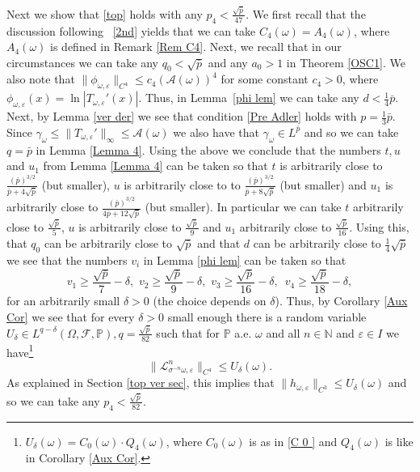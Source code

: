 \documentclass[11pt,reqno,a4paper]{article}
\theoremstyle{special}
\def\om{\omega}
\begin{document}
Next we show that \eqref{top} holds with any $p_4<\frac{\sqrt{\bar p}}{47}$. We first recall that the discussion following~ \eqref{2nd} yields   that we can take $C_4(\om)=A_4(\om)$, where $A_4(\om)$ is defined in Remark \ref{Rem C4}.
Next, we recall that in our circumstances we can take any $q_0<\sqrt{\bar p}$ and any $a_0>1$ in Theorem \ref{OSC1}.
We also note that $\|\phi_{\om,\varepsilon}\|_{C^4}\leq c_4 (\mathcal A(\om))^4$ for some constant $c_4>0$, where $\phi_{\om,\varepsilon}(x)=\ln|T_{\om,\varepsilon}'(x)|$. Thus, in Lemma~\ref{phi lem} we can take any $d<\frac14\bar p$. Next, by Lemma \ref{ver der} we see that condition \eqref{Pre Adler} holds with $p=\frac13\bar p$. Since $\gamma_\om\leq \|T_{\om,\varepsilon}' \|_\infty \leq \mathcal A(\om)$ we also have that $\gamma_\om\in L^{\bar p}$ and so we can take $q=\bar p$ in Lemma \ref{Lemma 4}. Using the above  we conclude that the numbers $t,u$ and $u_1$ from Lemma \ref{Lemma 4} can be taken so that $t$ is arbitrarily close to $\frac{(\bar p)^{3/2}}{\bar p+4\sqrt{\bar p}}$ (but smaller), $u$ is arbitrarily close to to $\frac{(\bar p)^{3/2}}{\bar p+8\sqrt{\bar p}}$ (but smaller) and $u_1$ is arbitrarily close to $\frac{(\bar p)^{3/2}}{4\bar p+12\sqrt{\bar p}}$ (but smaller). In particular we can take $t$ arbitrarily close to $\frac{\sqrt{\bar p}}{5}$, $u$ is arbitrarily close to  $\frac{\sqrt{\bar p}}{9}$ and $u_1$  arbitrarily close to $\frac{\sqrt{\bar p}}{16}$.
Using this, that $q_0$ can be arbitrarily close to $\sqrt{\bar p}$ and that $d$ can be arbitrarily close to $\frac14\sqrt{\bar p}$  we see that the numbers $v_i$ in Lemma \ref{phi lem} can be taken so that
\begin{equation}\label{v's}
 v_1\geq \frac{\sqrt{\bar p}}{7}-\delta,\,\, v_2\geq  
\frac{\sqrt{\bar p}}{9}-\delta,\,\,v_3\geq \frac{\sqrt{\bar p}}{16}-\delta,\,\,\, v_4\geq \frac{\sqrt{\bar p}}{18}-\delta ,  
\end{equation}
for an arbitrarily small $\delta>0$ (the choice depends on $\delta$).
Thus, by Corollary \ref{Aux Cor} we see that for every $\delta>0$ small enough there is a random variable $U_\delta\in L^{q-\delta}(\Omega,\mathcal F,
\mathbb P), q=\frac{\sqrt{\bar p}}{82}$ such that for $\mathbb P$ a.e. $\om$ and all $n\in\mathbb N$ and $\varepsilon\in I$ we have\footnote{$U_\delta(\om)=C_0(\om)\cdot Q_4(\om)$, where $C_0(\om)$ is as in \eqref{C 0 } and $Q_4(\om)$ is like in Corollary \ref{Aux Cor}.}
\begin{equation}\label{estt}
\|\mathcal   L_{\sigma^{-n}\om, \varepsilon}^n \|_{C^4}\leq U_\delta(\om).   
\end{equation}
As explained in Section \ref{top ver sec}, this implies that $\|h_{\om,\varepsilon}\|_{C^3}\leq U_\delta(\om)$ and so we can take any $p_4<\frac{\sqrt{\bar p}}{82}$. 
\end{document}
